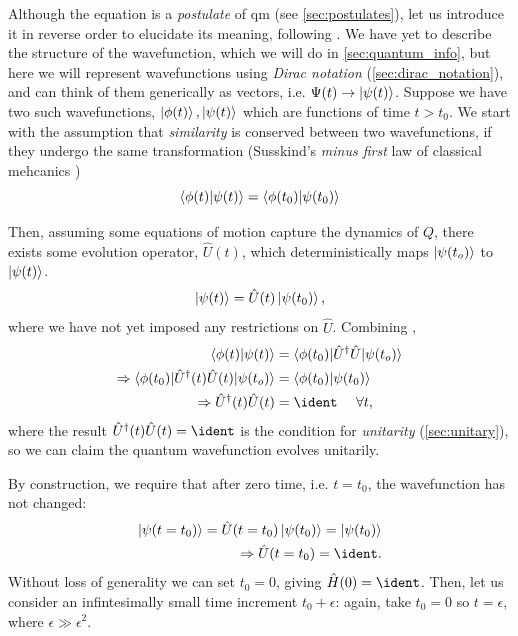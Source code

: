 Although the \schrodinger equation is a \emph{postulate} of \gls{qm} (see \cref{sec:postulates}), 
    let us introduce it in reverse order to elucidate its meaning, following \cite{susskind2014quantum}. 
We have yet to describe the structure of the wavefunction, which we will do in \cref{sec:quantum_info},
    but here we will represent wavefunctions using \emph{Dirac notation} (\cref{sec:dirac_notation}), 
    and can think of them generically as vectors, i.e. $\Psi(t) \rightarrow \ket{\psi(t)}$. 
Suppose we have two such wavefunctions, $\ket{\phi(t)}, \ket{\psi(t)}$ which are functions of time $t > t_0$.
We start with the assumption that \emph{similarity} is conserved between two wavefunctions,
    if they undergo the same transformation 
    (Susskind's \emph{minus first} law of classical mehcanics \cite{susskind2014quantum})
\begin{equation}
    \label{eqn:conservation_simularity}
    \braket{\phi(t) | \psi(t)} = \braket{\phi(t_0) | \psi(t_0)}
\end{equation}

Then, assuming some equations of motion capture the dynamics of $Q$, 
    there exists some evolution operator, $\hat{U}(t)$, which deterministically maps $\ket{\psi(t_o)}$ to $\ket{\psi(t)}$.
\begin{equation}
    \label{eqn:unitary_time_evolution}
    \ket{\psi(t)} = \hat{U}(t) \ket{\psi(t_0)},
\end{equation}
    where we have not yet imposed any restrictions on $\hat{U}$. 
Combining , 
\begin{equation}
    \begin{split}
        \braket{\phi(t) | \psi(t)} &= \braket{ \phi(t_0) | \hat{U}^{\dag} \hat{U}| \psi(t_o) }
        \\
        \Rightarrow \braket{ \phi(t_0) | \hat{U}^{\dag}(t) \hat{U}(t) | \psi(t_o) } &= \braket{\phi(t_0) | \psi(t_0)}
        \\
        \Rightarrow \hat{U}^{\dag}(t) \hat{U}(t) &= \ident \ \ \ \ \forall t,
    \end{split}
\end{equation}
where the result $\hat{U}^{\dag}(t) \hat{U}(t) = \ident$ is the condition for \emph{unitarity} (\cref{sec:unitary}), 
    so we can claim the quantum wavefunction evolves unitarily. 
\par 

By construction, we require that after zero time, i.e. $t = t_0$, the wavefunction has not changed:
\begin{equation}
    \begin{split}
        \ket{\psi(t = t_0)} = \hat{U}(t = t_0)\ket{\psi(t_0)} = \ket{\psi(t_0)}
        \\ \Rightarrow \hat{U}(t = t_0) = \ident.
    \end{split}
\end{equation}
Without loss of generality we can set $t_0 = 0$, giving $\hat{H}(0) = \ident$. 
Then, let us consider an infintesimally small time increment $t_0 + \epsilon$:
    again, take $t_0 = 0$ so $t = \epsilon$,  where $\epsilon \gg \epsilon^2$. 

